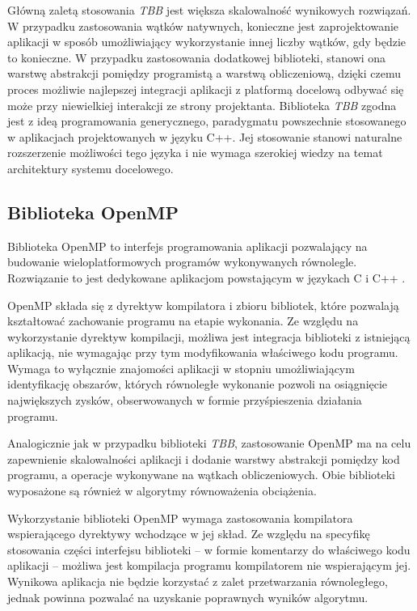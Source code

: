Główną zaletą stosowania \emph{TBB} jest większa skalowalność wynikowych rozwiązań. 
W przypadku zastosowania wątków natywnych, konieczne jest zaprojektowanie aplikacji w sposób umożliwiający wykorzystanie innej liczby wątków, gdy będzie to konieczne. 
W przypadku zastosowania dodatkowej biblioteki, stanowi ona warstwę abstrakcji pomiędzy programistą a warstwą obliczeniową, dzięki czemu proces możliwie najlepszej integracji aplikacji z platformą docelową odbywać się może przy niewielkiej interakcji ze strony projektanta.
Biblioteka \emph{TBB} zgodna jest z ideą programowania generycznego, paradygmatu powszechnie stosowanego w aplikacjach projektowanych w języku C++.
Jej stosowanie stanowi naturalne rozszerzenie możliwości tego języka i nie wymaga szerokiej wiedzy na temat architektury systemu docelowego.

\subsection{Biblioteka OpenMP}

Biblioteka OpenMP to interfejs programowania aplikacji pozwalający na budowanie wieloplatformowych programów wykonywanych równolegle. 
Rozwiązanie to jest dedykowane aplikacjom powstającym w językach C i C++ \cite{openmp-guide}.

OpenMP składa się z dyrektyw kompilatora i zbioru bibliotek, które pozwalają kształtować zachowanie programu na etapie wykonania. %
Ze względu na wykorzystanie dyrektyw kompilacji, możliwa jest integracja biblioteki z istniejącą aplikacją, nie wymagając przy tym modyfikowania właściwego kodu programu. 
Wymaga to wyłącznie znajomości aplikacji w stopniu umożliwiającym identyfikację obszarów, których równoległe wykonanie pozwoli na osiągnięcie największych zysków, obserwowanych w formie przyśpieszenia działania programu. %

Analogicznie jak w przypadku biblioteki \emph{TBB}, zastosowanie OpenMP ma na celu zapewnienie skalowalności aplikacji i dodanie warstwy abstrakcji pomiędzy kod programu, a operacje wykonywane na wątkach obliczeniowych. 
Obie biblioteki wyposażone są również w algorytmy równoważenia obciążenia.

Wykorzystanie biblioteki OpenMP wymaga zastosowania kompilatora wspierającego dyrektywy wchodzące w jej skład. 
Ze względu na specyfikę stosowania części interfejsu biblioteki -- w formie komentarzy do właściwego kodu aplikacji -- możliwa jest kompilacja programu kompilatorem nie wspierającym jej. 
Wynikowa aplikacja nie będzie korzystać z zalet przetwarzania równoległego, jednak powinna pozwalać na uzyskanie poprawnych wyników algorytmu.

